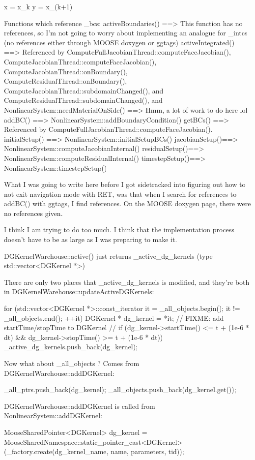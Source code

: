 {x = x_k
y = x_(k+1)

Functions which reference _bcs:
activeBoundaries() ==> This function has no references, so I'm not going to worry about implementing an analogue for _intcs (no references either through MOOSE doxygen or ggtags)
activeIntegrated() ==> Referenced by ComputeFullJacobianThread::computeFaceJacobian(), ComputeJacobianThread::computeFaceJacobian(), ComputeJacobianThread::onBoundary(), ComputeResidualThread::onBoundary(), ComputeJacobianThread::subdomainChanged(), and ComputeResidualThread::subdomainChanged(), and NonlinearSystem::needMaterialOnSide() ==> Hmm, a lot of work to do here lol
addBC() ==> NonlinearSystem::addBoundaryCondition()
getBCs() ==> Referenced by ComputeFullJacobianThread::computeFaceJacobian().
initialSetup() ==> NonlinearSystem::initialSetupBCs()
jacobianSetup()==> NonlinearSystem::computeJacobianInternal()
residualSetup()==> NonlinearSystem::computeResidualInternal()
timestepSetup()==> NonlinearSystem::timestepSetup()

What I was going to write here before I got sidetracked into figuring out how to not exit navigation mode with RET, was that when I search for references to addBC() with ggtags, I find references. On the MOOSE doxygen page, there were no references given.

I think I am trying to do too much. I think that the implementation process doesn't have to be as large as I was preparing to make it.

DGKernelWarehouse::active() just returns _active_dg_kernels (type std::vector<DGKernel *>)

There are only two places that _active_dg_kernels is modified, and they're both in DGKernelWarehouse::updateActiveDGKernels:

  for (std::vector<DGKernel *>::const_iterator it = _all_objects.begin(); it != _all_objects.end(); ++it)
  {
    DGKernel * dg_kernel = *it;
    // FIXME: add startTime/stopTime to DGKernel
//    if (dg_kernel->startTime() <= t + (1e-6 * dt) && dg_kernel->stopTime() >= t + (1e-6 * dt))
      _active_dg_kernels.push_back(dg_kernel);
  }

Now what about _all_objects ? Comes from DGKernelWarehouse::addDGKernel:

{
  _all_ptrs.push_back(dg_kernel);
  _all_objects.push_back(dg_kernel.get());
}

DGKernelWarehouse::addDGKernel is called from NonlinearSystem::addDGKernel:

    MooseSharedPointer<DGKernel> dg_kernel = MooseSharedNamespace::static_pointer_cast<DGKernel>(_factory.create(dg_kernel_name, name, parameters, tid));

}
